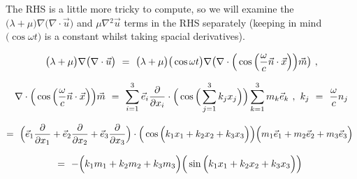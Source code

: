 \documentclass{article}
\begin{document}
The RHS is a little more tricky to compute, so we will examine the \begin{math} \big( \lambda + \mu \big) \nabla \big( \nabla \cdot \vec{u} \big) \end{math} and \begin{math} \mu \nabla{}^2 \vec{u} \end{math} terms in the RHS separately (keeping in mind \begin{math} \big( \cos{ \omega t } \big) \end{math} is a constant whilst taking spacial derivatives). 

\begin{equation} \label{eq:1}
\big( \lambda + \mu \big) \nabla \big( \nabla \cdot \vec{u} \big) \hspace{0.125cm} = \hspace{0.125cm} \big( \lambda + \mu \big) \big( \cos{ \omega t } \big) \nabla \big( \nabla \cdot \Big( \cos \Big( \frac{\omega}{c} \vec{n} \cdot \vec{x} \Big) \Big) \vec{m} \big) \hspace{0.125cm} ,
\end{equation}

\begin{equation} \label{eq:1}
\nabla \cdot \Big( \cos \Big( \frac{\omega}{c} \vec{n} \cdot \vec{x} \Big) \Big) \vec{m} \hspace{0.125cm} = \hspace{0.125cm} \sum_{i = 1}^{3} \vec{e}_i \frac{\partial}{\partial{x_i}} \cdot \Big( \cos \Big( \sum_{j = 1}^{3} k_j x_j \Big) \Big) \sum_{k = 1}^{3} m_k \vec{e}_k \hspace{0.125cm} ,  \hspace{0.125cm} k_j \hspace{0.125cm} = \hspace{0.125cm} \frac{\omega}{c} n_j 
\end{equation}

\begin{equation} \label{eq:1}
= \hspace{0.125cm} \Big( \vec{e}_1 \frac{\partial}{\partial{x_1}} + \vec{e}_2 \frac{\partial}{\partial{x_2}} + \vec{e}_3 \frac{\partial}{\partial{x_3}} \Big)  \cdot \Big( \cos \Big( k_1 x_1 + k_2 x_2 + k_3 x_3 \Big) \Big) \Big( m_1 \vec{e}_1 + m_2 \vec{e}_2 + m_3 \vec{e}_3 \Big) \hspace{0.125cm}
\end{equation}

\begin{equation} \label{eq:1}
= \hspace{0.125cm} - \Big( k_1 m_1 + k_2 m_2 + k_3 m_3 \Big) \Big( \sin \Big( k_1 x_1 + k_2 x_2 + k_3 x_3 \Big) \Big) \hspace{0.125cm} 
\end{equation}
\end{document}
